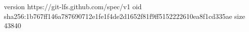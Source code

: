 version https://git-lfs.github.com/spec/v1
oid sha256:1b767ff146a787690712e1fe1f4de2d1652f81f9ff5152222610ea8f1cd335ae
size 43840
